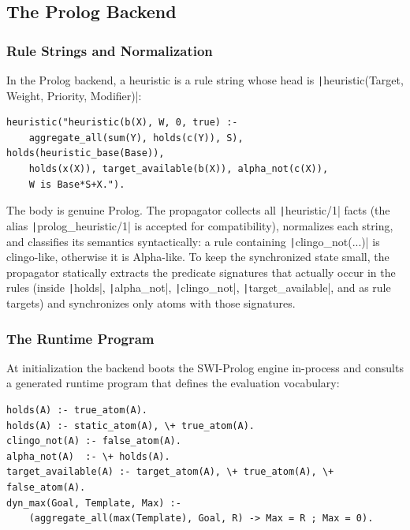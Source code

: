 \subsection{The Prolog Backend}

\subsubsection{Rule Strings and Normalization}

In the Prolog backend, a heuristic is a rule string whose head is \texttt|heuristic(Target, Weight, Priority, Modifier)|:

\begin{verbatim}
heuristic("heuristic(b(X), W, 0, true) :-
    aggregate_all(sum(Y), holds(c(Y)), S), holds(heuristic_base(Base)),
    holds(x(X)), target_available(b(X)), alpha_not(c(X)),
    W is Base*S+X.").
\end{verbatim}

The body is genuine Prolog. The propagator collects all \texttt|heuristic/1| facts (the alias \texttt|prolog_heuristic/1| is accepted for compatibility), normalizes each string, and classifies its semantics syntactically: a rule containing \texttt|clingo_not(...)| is clingo-like, otherwise it is Alpha-like. To keep the synchronized state small, the propagator statically extracts the predicate signatures that actually occur in the rules (inside \texttt|holds|, \texttt|alpha_not|, \texttt|clingo_not|, \texttt|target_available|, and as rule targets) and synchronizes only atoms with those signatures.

\subsubsection{The Runtime Program}

At initialization the backend boots the SWI-Prolog engine in-process \cite{wielemaker2012swipl} and consults a generated runtime program that defines the evaluation vocabulary:

\begin{verbatim}
holds(A) :- true_atom(A).
holds(A) :- static_atom(A), \+ true_atom(A).
clingo_not(A) :- false_atom(A).
alpha_not(A)  :- \+ holds(A).
target_available(A) :- target_atom(A), \+ true_atom(A), \+ false_atom(A).
dyn_max(Goal, Template, Max) :-
    (aggregate_all(max(Template), Goal, R) -> Max = R ; Max = 0).
\end{verbatim}

